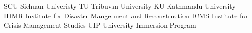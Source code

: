 SCU   Sichuan Univeristy
TU    Tribuvan University
KU    Kathmandu University
IDMR  Institute for Disaster Mangerment and Reconstruction
ICMS  Institute for Crisis Management Studies
UIP   University Immersion Program


